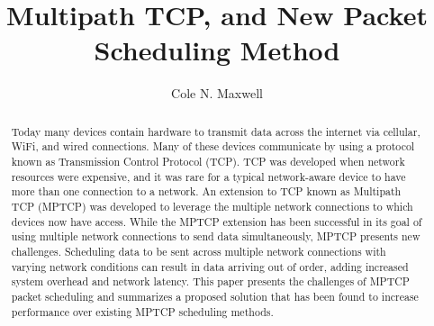 \documentclass[sigplan,screen,nonacm]{acmart}
\begin{document}
\title{Multipath TCP, and New Packet Scheduling Method}

\author{Cole N. Maxwell}
\begin{abstract}
Today many devices contain hardware to transmit data across the internet via cellular, WiFi, and wired connections. Many of these devices communicate by using a protocol known as Transmission Control Protocol (TCP).  TCP was developed when network resources were expensive, and it was rare for a typical network-aware device to have more than one connection to a network.  An extension to TCP known as Multipath TCP (MPTCP) was developed to leverage the multiple network connections to which devices now have access. While the MPTCP extension has been successful in its goal of using multiple network connections to send data simultaneously, MPTCP presents new challenges. Scheduling data to be sent across multiple network connections with varying network conditions can result in data arriving out of order, adding increased system overhead and network latency. This paper presents the challenges of MPTCP packet scheduling and summarizes a proposed solution that has been found to increase performance over existing MPTCP scheduling methods.
\end{abstract}
\doclicenseThis
\maketitle
\end{document}
